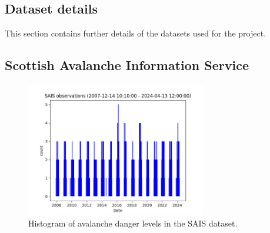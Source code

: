 \documentclass{article}
\newcommand{\sais}{Scottish Avalanche Information Service}
\begin{document}
\newpage
\begin{appendices}
	\section{Dataset details}
	This section contains further details of the datasets used for the project.

	\subsection{\sais}
	
	
	
	\begin{figure}[h]
		\centering
		\includegraphics[width=0.7\textwidth]{sais_observation_histogram.png}
		\caption{Histogram of avalanche danger levels in the SAIS dataset.}
		\label{fig:sais_observation_histogram}
	\end{figure}

	
	
	
	
	
	
\end{appendices}
	

%   
%    
\nocite{*}
\end{document}
